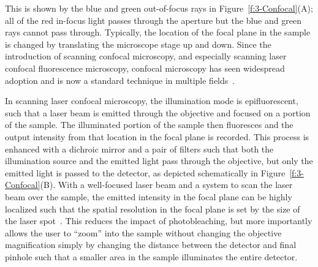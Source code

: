 This is shown by the blue and green out-of-focus rays in Figure~\ref{f:3-Confocal}(A); all of the red in-focus light passes through the aperture but the blue and green rays cannot pass through.
Typically, the location of the focal plane in the sample is changed by translating the microscope stage up and down.
Since the introduction of scanning confocal microscopy, and especially scanning laser confocal fluorescence microscopy, confocal microscopy has seen widespread adoption and is now a standard technique in multiple fields~\cite{RN261,RN262,RN260}.

In scanning laser confocal microscopy, the illumination mode is epifluorescent, such that a laser beam is emitted through the objective and focused on a portion of the sample.
The illuminated portion of the sample then fluoresces and the output intensity from that location in the focal plane is recorded.
This process is enhanced with a dichroic mirror and a pair of filters such that both the illumination source and the emitted light pass through the objective, but only the emitted light is passed to the detector, as depicted schematically in Figure~\ref{f:3-Confocal}(B).
With a well-focused laser beam and a system to scan the laser beam over the sample, the emitted intensity in the focal plane can be highly localized such that the spatial resolution in the focal plane is set by the size of the laser spot~\cite{RN260}.
This reduces the impact of photobleaching, but more importantly allows the user to ``zoom'' into the sample without changing the objective magnification simply by changing the distance between the detector and final pinhole such that a smaller area in the sample illuminates the entire detector.

